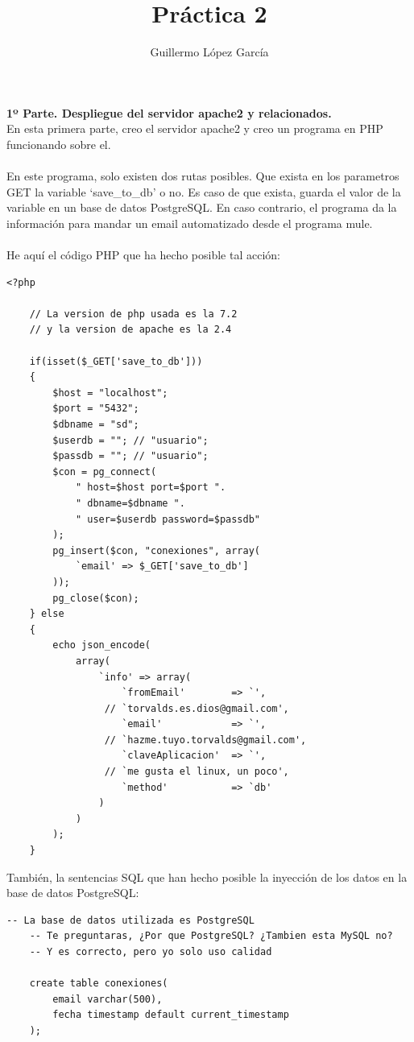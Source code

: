 \documentclass{article}
\title{Práctica 2}
\author{Guillermo López García}
\begin{document}
\maketitle
\textbf{1º Parte. Despliegue del servidor apache2 y relacionados.}\\
En esta primera parte, creo el servidor apache2 y creo un programa
en PHP funcionando sobre el.\\
\\
En este programa, solo existen dos rutas posibles. Que exista en los
parametros GET la variable `save\_to\_db' o no. Es caso de que exista,
guarda el valor de la variable en un base de datos PostgreSQL\@. En caso
contrario, el programa da la información para mandar un email
automatizado desde el programa mule.\\
\\
He aquí el código PHP que ha hecho posible tal acción:\\

\lstset{language=PHP, texcl=true}
\begin{lstlisting}[frame=single]
    <?php

    // La version de php usada es la 7.2
    // y la version de apache es la 2.4

    if(isset($_GET['save_to_db']))
    {
        $host = "localhost";
        $port = "5432";
        $dbname = "sd";
        $userdb = ""; // "usuario";
        $passdb = ""; // "usuario";
        $con = pg_connect(
            " host=$host port=$port ".
            " dbname=$dbname ".
            " user=$userdb password=$passdb"
        );
        pg_insert($con, "conexiones", array(
            `email' => $_GET['save_to_db']
        ));
        pg_close($con);
    } else
    {
        echo json_encode(
            array(
                `info' => array(
                    `fromEmail'        => `',
                 // `torvalds.es.dios@gmail.com',
                    `email'            => `',
                 // `hazme.tuyo.torvalds@gmail.com',
                    `claveAplicacion'  => `',
                 // `me gusta el linux, un poco',
                    `method'           => `db'
                )
            )
        );
    }
\end{lstlisting}

También, la sentencias SQL que han hecho posible la
inyección de los datos en la base de datos PostgreSQL:\\

\lstset{language=SQL, texcl=true}
\begin{lstlisting}[frame=single]
    -- La base de datos utilizada es PostgreSQL
    -- Te preguntaras, ¿Por que PostgreSQL? ¿Tambien esta MySQL no?
    -- Y es correcto, pero yo solo uso calidad
    
    create table conexiones(
        email varchar(500),
        fecha timestamp default current_timestamp
    );
\end{lstlisting}
\end{document}
